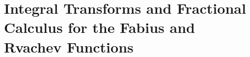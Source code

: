 \documentclass[11pt,oneside]{article}
\newcommand{\integrationreportreset}{%
  \clearpage
  \setcounter{section}{0}%
  \renewcommand{\thesection}{\arabic{section}}}
\theoremstyle{definition}
\theoremstyle{remark}
\newcommand{\1}{\mathbf 1}
\begin{document}
\newcommand{\statusproved}{\textcolor{statusgreen}{\textbf{proved here}}}
\newcommand{\statusderived}{\textcolor{statusblue}{\textbf{derived from audited inputs}}}
\newcommand{\statusnumeric}{\textcolor{statusorange}{\textbf{numerically checked}}}
\newcommand{\statusopen}{\textcolor{statusred}{\textbf{conjectural/open}}}
\newcommand{\sincPartxx}{\operatorname{sinc}}
\newcommand{\Ree}{\operatorname{Re}}
\newcommand{\Laplace}{\mathcal L}
\newcommand{\Fourier}{\mathcal F_{\!\mathrm{our}}}
\newcommand{\poch}[2]{(#1)_{#2}}
\newcommand{\Gevrey}{\mathcal G}
\newcommand{\extF}{\mathcal F}
\newcommand{\Aop}{\mathfrak A}
\newcommand{\JPartxx}{\mathcal J}
\newcommand{\KPartxx}{\mathcal K}
\newcommand{\Phiup}{\Phi}
\newcommand{\littleo}{o}
\newcommand{\repoPartxx}{\nolinkurl{ProveIt/Analysis/FabiusFunction/docs}}
\newcommand{\PV}{\operatorname{PV}}

\integrationreportreset
\part{Integral Transforms and Fractional Calculus for the Fabius and Rvachev Functions}
\end{document}

